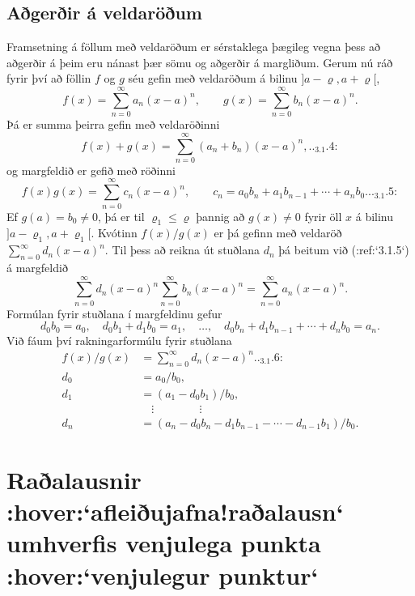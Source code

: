 \subsection*{Aðgerðir á veldaröðum}

Framsetning á
föllum með veldaröðum er sérstaklega þægileg vegna þess að aðgerðir á
þeim eru nánast þær sömu og aðgerðir á margliðum.  Gerum nú ráð fyrir
því að föllin $f$ og $g$ séu gefin með veldaröðum á bilinu
$]a-{\varrho},a+{\varrho}[$,
$$
f(x)=\sum\limits_{n=0}^{\infty} a_n(x-a)^n,\qquad
g(x)=\sum\limits_{n=0}^{\infty} b_n(x-a)^n.
$$
Þá er summa þeirra gefin með veldaröðinni
\begin{equation*}
f(x)+g(x)=\sum\limits_{n=0}^{\infty} (a_n+b_n)(x-a)^n,

.. _3.1.4:

\end{equation*}
og margfeldið er gefið með röðinni
\begin{equation*}
f(x)g(x)=\sum\limits_{n=0}^{\infty} c_n(x-a)^n, 
\qquad
c_n=a_0b_n+a_1b_{n-1}+\cdots+a_nb_0.

.. _3.1.5:

\end{equation*}
Ef $g(a)=b_0\neq 0$, þá er til ${\varrho}_1\leq {\varrho}$
þannig að $g(x)\neq 0$ fyrir öll $x$ á bilinu
$]a-{\varrho}_1,a+{\varrho}_1[$.
Kvótinn $f(x)/g(x)$ er þá gefinn með veldaröð
$\sum\limits_{n=0}^{\infty} d_n(x-a)^n$.  Til þess að reikna út stuðlana
$d_n$ þá beitum við (:ref:`3.1.5`) á margfeldið
$$
\sum\limits_{n=0}^{\infty} d_n(x-a)^n
\sum\limits_{n=0}^{\infty} b_n(x-a)^n
=\sum\limits_{n=0}^{\infty} a_n(x-a)^n.
$$
Formúlan fyrir stuðlana í margfeldinu gefur
$$
d_0b_0=a_0, \quad
d_0b_1+d_1b_0=a_1, \quad \dots, \quad 
d_0b_n+d_1b_{n-1}+\cdots+d_nb_0=a_n.
$$
Við fáum því rakningarformúlu fyrir stuðlana
\begin{align*}
f(x)/g(x)&=\sum\limits_{n=0}^{\infty} d_n(x-a)^n

.. _3.1.6:
\\
d_0&=a_0/b_0,\\
d_1&=(a_1-d_0b_1)/b_0,\\
&\quad \vdots\qquad\qquad \vdots\\
d_n&=(a_n-d_0b_n-d_1b_{n-1}-\cdots-d_{n-1}b_1)/b_0.
\end{align*}

 
\section{Raðalausnir :hover:`afleiðujafna!raðalausn` umhverfis
venjulega punkta :hover:`venjulegur punktur`}


